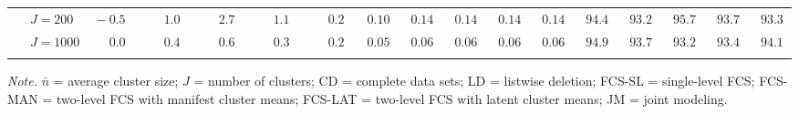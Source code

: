 \begin{sidewaystable}
\begin{threeparttable}
\begin{tabular}{llccccccccccccccc}
 & \nopagebreak $\;J=200$  & $\phantom{0}{-}0.5\phantom{0}$ & $\phantom{0}\phantom{-}1.0\phantom{0}$ & $\phantom{0}\phantom{-}2.7\phantom{0}$ & $\phantom{0}\phantom{-}1.1\phantom{0}$ & $\phantom{0}\phantom{-}0.2\phantom{0}$ & $\phantom{0}0.10\phantom{0}$ & $\phantom{0}0.14\phantom{0}$ & $\phantom{0}0.14\phantom{0}$ & $\phantom{0}0.14\phantom{0}$ & $\phantom{0}0.14\phantom{0}$ & $\phantom{0}94.4\phantom{0}$ & $\phantom{0}93.2\phantom{0}$ & $\phantom{0}95.7\phantom{0}$ & $\phantom{0}93.7\phantom{0}$ & $\phantom{0}93.3\phantom{0}$ \\
 & \nopagebreak $\;J=1000$  & $\phantom{0}\phantom{-}0.0\phantom{0}$ & $\phantom{0}\phantom{-}0.4\phantom{0}$ & $\phantom{0}\phantom{-}0.6\phantom{0}$ & $\phantom{0}\phantom{-}0.3\phantom{0}$ & $\phantom{0}\phantom{-}0.2\phantom{0}$ & $\phantom{0}0.05\phantom{0}$ & $\phantom{0}0.06\phantom{0}$ & $\phantom{0}0.06\phantom{0}$ & $\phantom{0}0.06\phantom{0}$ & $\phantom{0}0.06\phantom{0}$ & $\phantom{0}94.9\phantom{0}$ & $\phantom{0}93.7\phantom{0}$ & $\phantom{0}93.2\phantom{0}$ & $\phantom{0}93.4\phantom{0}$ & $\phantom{0}94.1\phantom{0}$ \\
[0.5ex]\hline\\[-1.6ex] 
\end{tabular}
\begin{tablenotes}{\footnotesize \textit{Note.} $\bar{n}$ = average cluster size; $J$ = number of clusters; CD = complete data sets; LD = listwise deletion; FCS-SL = single-level FCS; FCS-MAN = two-level FCS with manifest cluster means; FCS-LAT = two-level FCS with latent cluster means; JM = joint modeling.}\end{tablenotes}
\end{threeparttable}
\end{sidewaystable}
